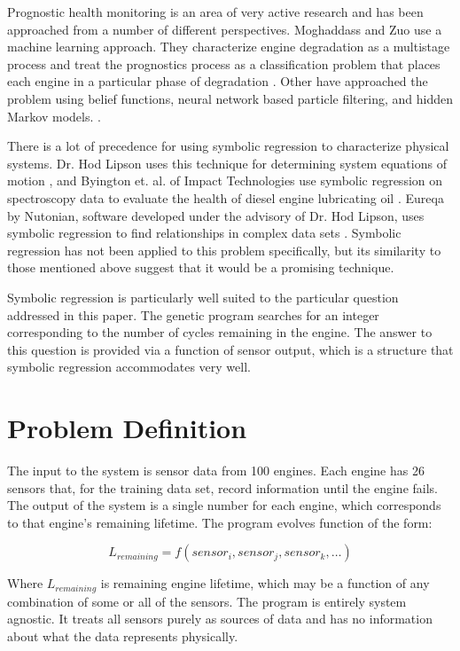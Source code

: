 \documentclass{acm_proc_article-sp}
\begin{document}
Prognostic health monitoring is an area of very active research and has been approached from a number of different perspectives. Moghaddass and Zuo use a machine learning approach. They characterize engine degradation as a multistage process and treat the prognostics process as a classification problem that places each engine in a particular phase of degradation \cite{Mog}. Other have approached the problem using belief functions, neural network based particle filtering, and hidden Markov models. \cite{nasa} \cite{oil}.

There is a lot of precedence for using symbolic regression to characterize physical systems. Dr. Hod Lipson uses this technique for determining system equations of motion \cite{symbolic}, and Byington et. al. of Impact Technologies use symbolic regression on spectroscopy data to evaluate the health of diesel engine lubricating oil \cite{oil}. Eureqa by Nutonian, software developed under the advisory of Dr. Hod Lipson, uses symbolic regression to find relationships in complex data sets \cite{nutonian}. Symbolic regression has not been applied to this problem specifically, but its similarity to those mentioned above suggest that it would be a promising technique. 

Symbolic regression is particularly well suited to the particular question addressed in this paper.  The genetic program searches for an integer corresponding to the number of cycles remaining in the engine. The answer to this question is provided via a function of sensor output, which is a structure that symbolic regression accommodates very well.


\section{Problem Definition}
The input to the system is sensor data from 100 engines. Each engine has 26 sensors that, for the training data set, record information until the engine fails. The output of the system is a single number for each engine, which corresponds to that engine's remaining lifetime. The program evolves function of the form:

\begin{equation}
L_{remaining} = f (sensor_{i}, sensor_{j}, sensor_{k}, \dots )
\end{equation}

Where $L_{remaining}$ is remaining engine lifetime, which may be a function of any combination of some or all of the sensors. The program is entirely system agnostic. It treats all sensors purely as sources of data and has no information about what the data represents physically.
\end{document}
